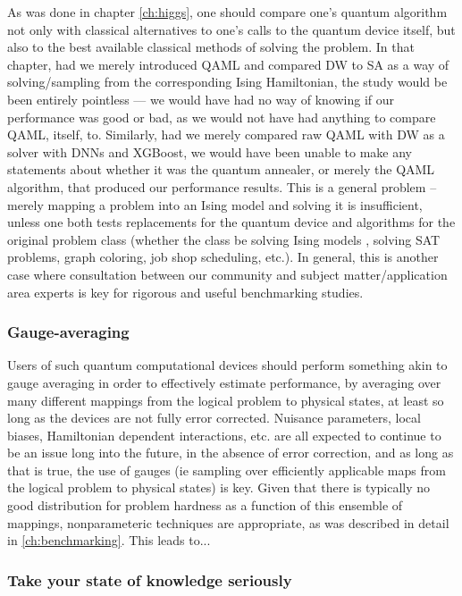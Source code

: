 	As was done in chapter \ref{ch:higgs}, one should compare one's quantum algorithm not only with classical alternatives to one's calls to the quantum device itself, but also to the best available classical methods of solving the problem. In that chapter, had we merely introduced QAML and compared DW to SA as a way of solving/sampling from the corresponding Ising Hamiltonian, the study would be been entirely pointless --- we would have had no way of knowing if our performance was good or bad, as we would not have had anything to compare QAML, itself, to. Similarly, had we merely compared raw QAML with DW as a solver with DNNs and XGBoost, we would have been unable to make any statements about whether it was the quantum annealer, or merely the QAML algorithm, that produced our performance results. This is a general problem -- merely mapping a problem into an Ising model and solving it is insufficient, unless one both tests replacements for the quantum device and algorithms for the original problem class (whether the class be solving Ising models \cite{speedup}, solving SAT problems\cite{MAX2SAT}, graph coloring\cite{perdomo2017readiness}, job shop scheduling\cite{perdomo2017readiness}, etc.). In general, this is another case where consultation between our community and subject matter/application area experts is key for rigorous and useful benchmarking studies.

\subsubsection{Gauge-averaging}

	Users of such quantum computational devices should perform something akin to gauge averaging in order to effectively estimate performance, by averaging over many different mappings from the logical problem to physical states, at least so long as the devices are not fully error corrected. Nuisance parameters, local biases, Hamiltonian dependent interactions, etc. are all expected to continue to be an issue long into the future, in the absence of error correction, and as long as that is true, the use of gauges (ie sampling over efficiently applicable maps from the logical problem to physical states) is key. Given that there is typically no good distribution for problem hardness as a function of this ensemble of mappings, nonparameteric techniques are appropriate, as was described in detail in \ref{ch:benchmarking}. This leads to...

\subsubsection{Take your state of knowledge seriously}

